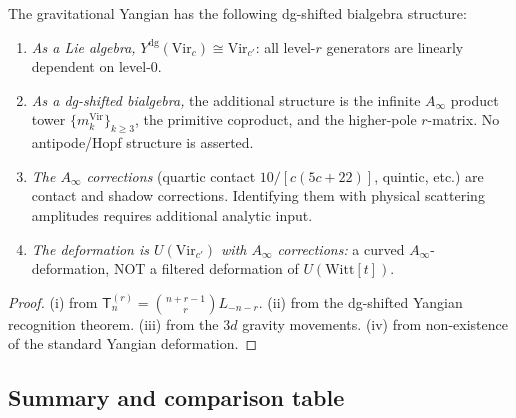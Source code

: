 \documentclass[11pt]{article}
\begin{document}
\begin{proposition}
\label{thm:gy-structure}
The gravitational Yangian has the following dg-shifted bialgebra
structure:
\begin{enumerate}[label=\textup{(\roman*)}]
\item \emph{As a Lie algebra,}
  $Y^{\mathrm{dg}}(\mathrm{Vir}_c) \cong \mathrm{Vir}_{c'}$:
  all level-$r$ generators are linearly dependent on level-$0$.

\item \emph{As a dg-shifted bialgebra,}
  the additional structure is the infinite $A_\infty$ product tower
  $\{m_k^{\mathrm{Vir}}\}_{k \ge 3}$, the primitive coproduct,
  and the higher-pole $r$-matrix.  No antipode/Hopf structure is
  asserted.

\item \emph{The $A_\infty$ corrections}
  (quartic contact $10/[c(5c+22)]$, quintic, etc.) are contact and
  shadow corrections.  Identifying them with physical scattering
  amplitudes requires additional analytic input.

\item \emph{The deformation is $U(\mathrm{Vir}_{c'})$ with
  $A_\infty$ corrections:} a curved $A_\infty$-deformation,
  NOT a filtered deformation of $U(\mathrm{Witt}[t])$.
\end{enumerate}
\end{proposition}

\begin{proof}
(i) from $\mathsf{T}_n^{(r)} = \binom{n+r-1}{r}L_{-n-r}$.
(ii) from the dg-shifted Yangian recognition theorem.
(iii) from the $3d$ gravity movements.
(iv) from non-existence of the standard Yangian deformation.
\end{proof}


\subsection{Summary and comparison table}
\end{document}

